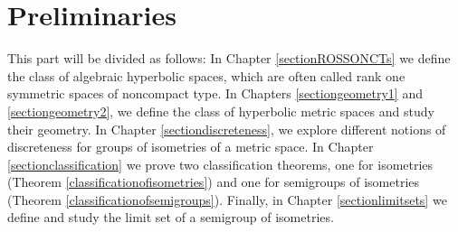 \part{Preliminaries}
\label{partpreliminaries}
This part will be divided as follows: In Chapter \ref{sectionROSSONCTs} we define the class of algebraic hyperbolic spaces, which are often called rank one symmetric spaces of noncompact type. In Chapters \ref{sectiongeometry1} and \ref{sectiongeometry2}, we define the class of hyperbolic metric spaces and study their geometry. In Chapter \ref{sectiondiscreteness}, we explore different notions of discreteness for groups of isometries of a metric space. In Chapter \ref{sectionclassification} we prove two classification theorems, one for isometries (Theorem \ref{classificationofisometries}) and one for semigroups of isometries (Theorem \ref{classificationofsemigroups}). Finally, in Chapter \ref{sectionlimitsets} we define and study the limit set of a semigroup of isometries.